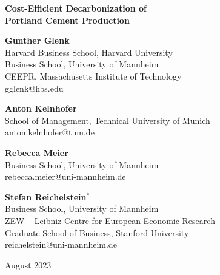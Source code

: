 \documentclass[12pt, a4paper]{article} %
\begin{document}
\renewcommand{\thefootnote}{\fnsymbol{footnote}}
\thispagestyle{empty}
\setcounter{footnote}{0}
\setlength{\baselineskip}{20pt} \thispagestyle{empty}
\renewcommand{\thefootnote}{\fnsymbol{footnote}}

\begin{center}
\hbox{}
{\Large\textbf{Cost-Efficient Decarbonization of \\ Portland Cement Production}}

\bigskip
\bigskip
{\bf Gunther Glenk}\footnotemark \\
Harvard Business School, Harvard University \\
Business School, University of Mannheim \\
CEEPR, Massachusetts Institute of Technology \\
gglenk@hbs.edu

\bigskip
\bigskip
{\bf Anton Kelnhofer} \\
School of Management, Technical University of Munich\\
anton.kelnhofer@tum.de

\bigskip
\bigskip
{\bf Rebecca Meier} \\
Business School, University of Mannheim \\
rebecca.meier@uni-mannheim.de

\bigskip
\bigskip

{\bf Stefan Reichelstein}$^*$ \\
Business School, University of Mannheim \\
ZEW -- Leibniz Centre for European Economic Research \\
Graduate School of Business, Stanford University \\
reichelstein@uni-mannheim.de

\bigskip
\bigskip
August 2023



\end{center}
\renewcommand{\thefootnote}{\arabic{footnote}}
\setcounter{footnote}{0}
\end{document}
